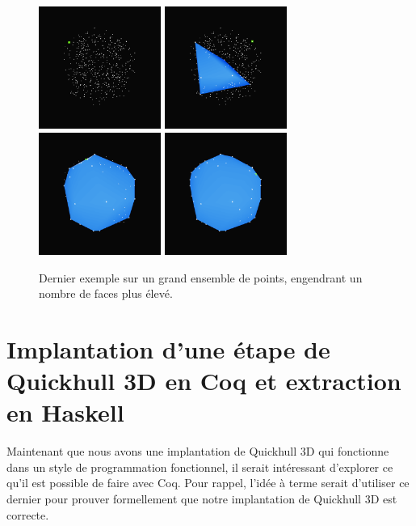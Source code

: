 \documentclass[]{article}
\begin{document}
\begin{figure}[H]
	\begin{center}
		\includegraphics[width=4cm]{qh3d/demo3d/main_0.png}
		\includegraphics[width=4cm]{qh3d/demo3d/main_1.png}
		\includegraphics[width=4cm]{qh3d/demo3d/main_2.png}
		\includegraphics[width=4cm]{qh3d/demo3d/main_3.png}
	\end{center}
	\caption{Dernier exemple sur un grand ensemble de points, engendrant un nombre de faces plus élevé.}
\end{figure}

\pagebreak
\section{Implantation d'une étape de Quickhull 3D en Coq et extraction en Haskell}
Maintenant que nous avons une implantation de Quickhull 3D qui fonctionne dans un style de programmation fonctionnel, il serait intéressant d'explorer ce qu'il est possible de faire avec Coq. Pour rappel, l'idée à terme serait d'utiliser ce dernier pour prouver formellement que notre implantation de Quickhull 3D est correcte.
\end{document}
